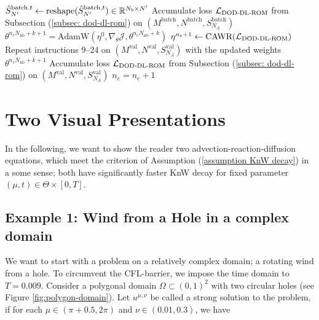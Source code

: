 \begin{algorithm}[H]
\begin{algorithmic}[1]
                \State $\hat S_{N'}^{\text{batch}, t} \gets
                \text{reshape}(\hat S_{N'}^{\text{batch}, t}) 
                \in \mathbb{R}^{N_b \times {N'}}$
            \EndFor
            \State Accumulate loss $\mathcal{L}_\text{DOD-DL-ROM}$
            from Subsection (\ref{subsec: dod-dl-rom}) on $(M^{\text{batch}}, N^\text{batch}, S_{N_A}^{\text{batch}})$ 
            \State $\theta^{n_e N_{\text{nb}}+k+1} = 
            \text{AdamW}(\eta^0, \nabla_\theta \mathcal{J}, \theta^{n_e N_{\text{nb}}+k})$
            \State $\eta^{n_e + 1} \gets \text{CAWR}(\mathcal{L}_\text{DOD-DL-ROM})$
        \EndFor
        \State Repeat instructions 9--24 on $(M^{\text{val}}, N^\text{val}, S_{N_A}^{\text{val}})$ 
        with the updated weights $\theta^{n_e N_{\text{nb}}+k+1}$
        \State Accumulate loss $\mathcal{L}_\text{DOD-DL-ROM}$
            from Subsection (\ref{subsec: dod-dl-rom}) on $(M^{\text{val}}, N^\text{val}, S_{N_A}^{\text{val}})$
        \State $n_e = n_e + 1$
        \EndWhile
        \end{algorithmic}
        \end{algorithm}




\section{Two Visual Presentations}

In the following, we want to show the reader two advection-reaction-diffusion equations, which
meet the criterion of Assumption (\ref{assumption KnW decay}) in a some sense;
both have significantly faster KnW decay for fixed parameter $(\mu, t) \in \Theta \times [0, T]$. 


\subsection{Example 1: Wind from a Hole in a complex domain}



We want to start with a problem on a relatively complex domain; a rotating wind 
from a hole. To circumvent the CFL-barrier, we impose the time domain to $T=0.009$.
Consider a polygonal domain $\Omega \subset (0,1)^2$
with two circular holes (see Figure \ref{fig:polygon-domain}). 
Let $u^{\mu,\nu}$ be called a strong solution to the problem, if for each 
$\mu \in (\pi+0.5, 2\pi)$ and $\nu \in (0.01,0.3)$, we have

